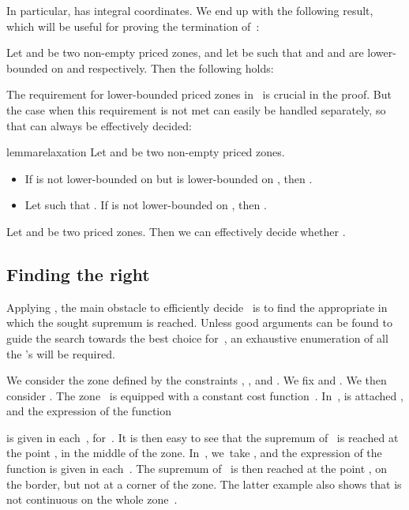 In particular,  has integral coordinates. We end up with the
following result, which will be useful for proving the termination
of~:
\begin{corollary}
  \label{theo:vertices}\label{coro:vertices}
  Let  and  be two
  non-empty priced zones, and let  be such that
   and  and  are
  lower-bounded on  and  respectively. Then the following
  holds:
  
\end{corollary}

The requirement for lower-bounded priced zones
in~ is crucial in the proof. 
But the case when this requirement is not met can easily be handled separately, so
that  can always be effectively decided:

\begin{restatable}{lemma}{relaxation}
  \label{lemma:relaxation}
  Let  and  be two
  non-empty priced zones.
  \begin{itemize}
  \item If  is not lower-bounded on  but  is
    lower-bounded on , then .
  \item Let  such that . If  is not lower-bounded on
    , then .
  \end{itemize}
\end{restatable}

\begin{corollary}
  Let  and  be two
  priced zones. Then we can effectively decide whether .
\end{corollary}

\subsection{Finding the right }
\label{sec:righty}

Applying , the main obstacle to efficiently
decide~ is to find the appropriate  in which the sought
supremum is reached. Unless good arguments can be found to guide the search
towards the best choice for~, an exhaustive enumeration of all the 's
will be required.

\begin{example}
  We consider the zone  defined by the constraints , ,  and .  We fix  and .  We then consider . The zone~ is equipped with a constant cost
  function~.
In~,  is attached , and
  the  
  expression of the function 
 
  is given in each~, for~.
  It is then easy to see that the supremum of~ is reached at the
  point 
  , in the middle of the zone.  In~,
  we~take , and the expression of the function
   is given in
  each~.  The supremum of~ is then reached at the point 
  , on the border, but not at a corner of the zone.  The latter
  example also shows that  is not continuous on the whole zone~.
\end{example}

